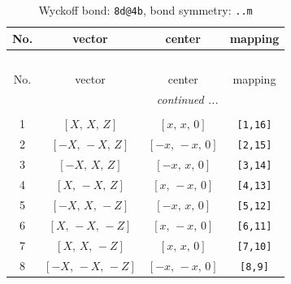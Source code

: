 \documentclass[fleqn,8pt]{jsarticle}
\begin{document}
\begin{longtable}{cccc}
\caption{Wyckoff bond: {\tt 8d@4b}, bond symmetry: {\tt ..m}}
 \\
 \hline \hline
No. & vector & center & mapping \\ \hline \endfirsthead

\multicolumn{3}{l}{\tablename\ \thetable{}} \\
 \hline \hline
No. & vector & center & mapping \\ \hline \endhead

 \hline \hline
\multicolumn{3}{r}{\footnotesize\it continued ...} \\ \endfoot

 \hline \hline
\multicolumn{3}{r}{} \\ \endlastfoot

1 & $\left[ X,\, X,\, Z \right]$ & $\left[ x,\, x,\, 0 \right]$ & {\tt [1,16]} \\ \hline
2 & $\left[ - X,\, - X,\, Z \right]$ & $\left[ - x,\, - x,\, 0 \right]$ & {\tt [2,15]} \\ \hline
3 & $\left[ - X,\, X,\, Z \right]$ & $\left[ - x,\, x,\, 0 \right]$ & {\tt [3,14]} \\ \hline
4 & $\left[ X,\, - X,\, Z \right]$ & $\left[ x,\, - x,\, 0 \right]$ & {\tt [4,13]} \\ \hline
5 & $\left[ - X,\, X,\, - Z \right]$ & $\left[ - x,\, x,\, 0 \right]$ & {\tt [5,12]} \\ \hline
6 & $\left[ X,\, - X,\, - Z \right]$ & $\left[ x,\, - x,\, 0 \right]$ & {\tt [6,11]} \\ \hline
7 & $\left[ X,\, X,\, - Z \right]$ & $\left[ x,\, x,\, 0 \right]$ & {\tt [7,10]} \\ \hline
8 & $\left[ - X,\, - X,\, - Z \right]$ & $\left[ - x,\, - x,\, 0 \right]$ & {\tt [8,9]} \\
\end{longtable}
\renewcommand{\arraystretch}{1.2}
\end{document}
